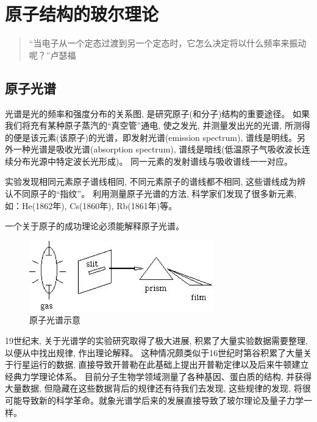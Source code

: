\section{原子结构的玻尔理论}

\begin{quotation}
``当电子从一个定态过渡到另一个定态时，它怎么决定将以什么频率来振动呢？''\qquad 卢瑟福
\end{quotation}

\subsection{原子光谱}


光谱是光的频率和强度分布的关系图, 是研究原子(和分子)结构的重要途径。
如果我们将充有某种原子蒸汽的``真空管''通电, 使之发光,
并测量发出光的光谱,
所测得的便是该元素(该原子)的光谱，即发射光谱(emission spectrum),
谱线是明线。另外一种光谱是吸收光谱(absorption spectrum),
谱线是暗线(低温原子气吸收波长连续分布光源中特定波长光形成)。
同一元素的发射谱线与吸收谱线一一对应。

实验发现相同元素原子谱线相同, 不同元素原子的谱线都不相同,
这些谱线成为辨认不同原子的``指纹''。 利用测量原子光谱的方法,
科学家们发现了很多新元素, 如：He(1862年), Cs(1860年), Rb(1861年)等。

一个关于原子的成功理论必须能解释原子光谱。

\begin{figure}[h]
\begin{center}
\includegraphics[clip,width=8cm]{BohrModel/4-1.ps}
\caption{原子光谱示意}
\end{center}
\end{figure}

19世纪末, 关于光谱学的实验研究取得了极大进展,
积累了大量实验数据需要整理, 以便从中找出规律, 作出理论解释。
这种情况颇类似于16世纪时第谷积累了大量关于行星运行的数据,
直接导致开普勒在此基础上提出开普勒定律以及后来牛顿建立经典力学理论体系。
目前分子生物学领域测量了各种基因、蛋白质的结构, 并获得大量数据,
但隐藏在这些数据背后的规律还有待我们去发现, 这些规律的发现,
将很可能导致新的科学革命。就象光谱学后来的发展直接导致了玻尔理论及量子力学一样。

